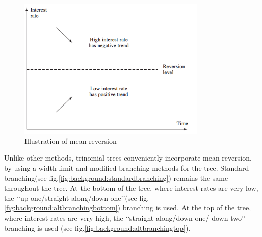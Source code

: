 \begin{figure}[H]
	\centering
	\includegraphics[width=0.8\textwidth]{img/meanreversion.png}
	\caption{Illustration of mean reversion}
	\label{fig:background:meanreversion}
\end{figure}

Unlike other methods, trinomial trees conveniently incorporate mean-reversion, by using a width limit and modified branching methods for the tree. Standard branching(see fig.\ref{fig:background:standardbranching}) remains the same throughout the tree. At the bottom of the tree, where interest rates are very low, the ‘‘up one/straight along/down one’’(see fig.\ref{fig:background:altbranchingbottom}) branching is used. At the top of the tree, where interest rates are very high, the ‘‘straight along/down one/ down two’’ branching is used (see fig.\ref{fig:background:altbranchingtop}). 

